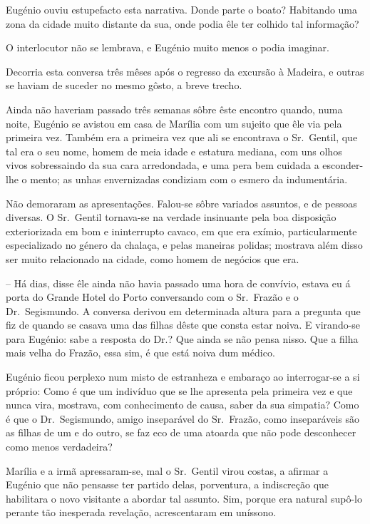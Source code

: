 \documentclass[9pt]{article}
\begin{document}
Eugé\-nio ouviu estupefacto esta narrativa. Donde parte o boato? Habitando uma zona da cidade muito distante da sua, onde podia êle ter co\-lhido
tal informa\-ção?

O interlocutor não se lembrava, e Eugé\-nio muito menos o podia imaginar.

Decorria esta conversa três mêses após o regresso da excursão à Madeira, e outras se haviam de suceder no mesmo gôsto, a breve trecho.

Ainda não haveriam passado três semanas sôbre êste encontro quan\-do, numa noite, Eugé\-nio se avistou em casa de Marília com um sujeito que êle via
pela primeira vez. Também era a primeira vez que ali se encontrava o
Sr.\ Gentil, que tal era o seu nome, homem de meia idade e estatura mediana,
com uns o\-lhos vivos sobressaindo da sua cara arredondada, e uma pera bem cuidada a esconder-\-lhe o mento; as unhas envernizadas condiziam com o esmero
da indumentária.

Não demoraram as apresenta\-ções. Falou-se sôbre variados assuntos, e de pessoas diversas. O Sr.\ Gentil tornava-se na verdade insinuante pela boa
disposi\-ção exteriorizada em bom e ininterrupto cavaco, em que era exímio, particularmente especializado no género da chalaça, e pelas maneiras polidas;
mostrava além disso ser muito relacionado na cidade, como homem de negócios
que era.

-- Há dias, disse êle ainda não havia passado uma hora de con\-ví\-vio, estava eu á porta do Grande Hotel do Porto conversando com o Sr.\ Frazão e o
Dr.\ Segismundo. A conversa derivou em determinada altura para a pregunta
que fiz de quan\-do se casava uma das fi\-lhas dêste que consta estar noiva. E
virando-se para Eugé\-nio: sabe a resposta do Dr.? Que ainda se não pensa
nisso. Que a fi\-lha mais ve\-lha do Frazão, essa sim, é que está noiva dum médico.

Eugé\-nio ficou perplexo num misto de estranheza e embaraço ao interrogar-se a si próprio: Como é que um indivíduo que se lhe apresenta pela primeira vez e que nunca vira, mostrava, com conhecimento de causa, saber da sua
simpatia? Como é que o Dr.\ Segismundo, amigo inseparável do Sr.\ Frazão, como
inseparáveis são as fi\-lhas de um e do outro, se faz eco de uma atoarda que não pode
desconhecer como menos verdadeira?

Marília e a irmã apressaram-se, mal o Sr.\ Gentil virou costas, a afirmar
a Eugé\-nio que não pensasse ter partido delas, porventura, a indiscre\-ção
que habilitara o novo visitante a abordar tal assunto. Sim, porque era natural supô-lo perante tão inesperada revela\-ção, acrescentaram em uníssono.
\end{document}
